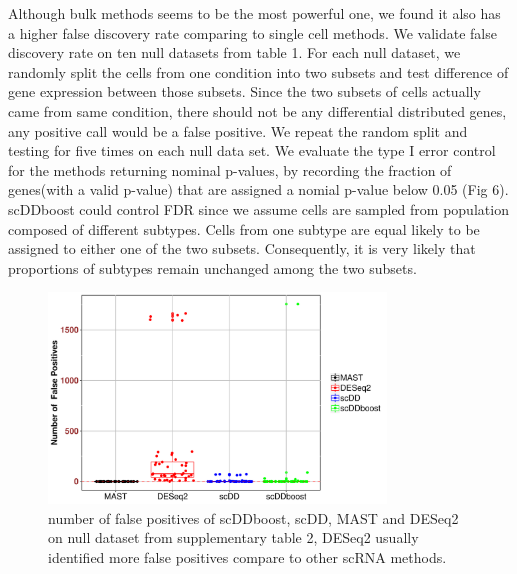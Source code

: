 \documentclass[aoas,preprint]{imsart}
\begin{document}
Although bulk methods seems to be the most powerful one, we found it also has a higher false discovery rate comparing to single cell methods. We validate false discovery rate on ten null datasets from table 1. For each null dataset, we randomly split the cells from one condition into two subsets and test difference of gene expression between those subsets. Since the two subsets of cells actually came from same condition, there should not be any differential distributed genes, any positive call would be a false positive. We repeat the random split and testing for five times on each null data set. We evaluate the type I error control for the methods returning nominal p-values, by recording the fraction of genes(with a valid p-value) that are assigned a nomial p-value below 0.05 (Fig 6).\\
scDDboost could control FDR since we assume cells are sampled from population composed of different subtypes. Cells from one subtype are equal likely to be assigned to either one of the two subsets. Consequently, it is very likely that proportions of subtypes remain unchanged among the two subsets.



\begin{figure}[H]
\includegraphics[width = 0.8\textwidth]{Figs/fdrCounts.pdf}
 \caption{number of false positives of scDDboost, scDD, MAST and DESeq2 on null dataset from supplementary table 2, DESeq2 usually identified more false positives compare to other scRNA methods.  }
  \label{fig:7}
\end{figure}
\end{document}
